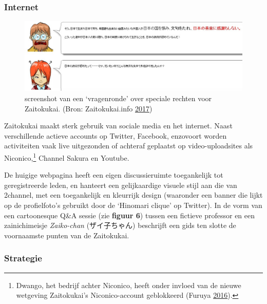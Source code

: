 \documentclass[10.5pt,dutch,]{article}
\begin{document}
\subsubsection{Internet}\label{internet}

\begin{figure}[htbp]
\centering
\includegraphics{images/zaitokukai_site_qa.jpg}
\caption{screenshot van een `vragenronde' over speciale rechten voor
Zaitokukai. (Bron: Zaitokukai.info
\protect\hyperlink{ref-zaitokukai.infoux5fzaitokukaiux5f2017}{2017})}
\end{figure}

Zaitokukai maakt sterk gebruik van sociale media en het internet. Naast
verschillende actieve accounts op Twitter, Facebook, enzovoort worden
activiteiten vaak live uitgezonden of achteraf geplaatst op
video-uploadsites als Niconico,\footnote{Dwango, het bedrijf achter
  Niconico, heeft onder invloed van de nieuwe wetgeving Zaitokukai's
  Niconico-account geblokkeerd (Furuya
  \protect\hyperlink{ref-furuyaux5fcanux5f2016}{2016}).} Channel Sakura
en Youtube.

De huigige webpagina heeft een eigen discussieruimte toegankelijk tot
geregistreerde leden, en hanteert een gelijkaardige visuele stijl aan
die van 2channel, met een toegankelijk en kleurrijk design (waaronder
een banner die lijkt op de profielfoto's gebruikt door de `Hinomari
clique' op Twitter). In de vorm van een cartoonesque Q\&A sessie (zie
\textbf{figuur 6}) tussen een fictieve professor en een zainichimeisje
\emph{Zaiko-chan} (ザイ子ちゃん) beschrijft een gids ten slotte de
voornaamste punten van de Zaitokukai.

\subsubsection{Strategie}\label{strategie}
\end{document}
